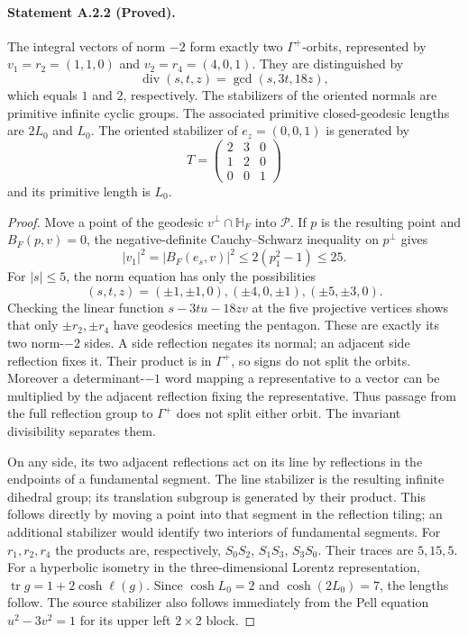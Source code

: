 \paragraph{Statement A.2.2 (Proved).}
The integral vectors of norm $-2$ form exactly two $\Gamma^+$-orbits,
represented by $v_1=r_2=(1,1,0)$ and $v_2=r_4=(4,0,1)$.
They are distinguished by
\[
 \operatorname{div}(s,t,z)=\gcd(s,3t,18z),
\]
which equals $1$ and $2$, respectively. The stabilizers of the oriented
normals are primitive infinite cyclic groups. The associated primitive
closed-geodesic lengths are $2L_0$ and $L_0$. The oriented stabilizer of
$e_z=(0,0,1)$ is generated by
\[
 T=\begin{pmatrix}2&3&0\\1&2&0\\0&0&1\end{pmatrix}
\]
and its primitive length is $L_0$.
\begin{proof}
Move a point of the geodesic $v^\perp\cap\mathbb H_F$ into $\mathcal P$.
If $p$ is the resulting point and $B_F(p,v)=0$, the negative-definite
Cauchy--Schwarz inequality on $p^\perp$ gives
\[
 |v_1|^2=|B_F(e_s,v)|^2\leq2(p_1^2-1)\leq25.
\]
For $|s|\leq5$, the norm equation has only the possibilities
\[(s,t,z)=(\pm1,\pm1,0),(\pm4,0,\pm1),(\pm5,\pm3,0).\]
Checking the linear function $s-3tu-18zv$ at the five projective vertices
shows that only $\pm r_2,\pm r_4$ have geodesics meeting the pentagon.
These are exactly its two norm-$-2$ sides. A side reflection negates its
normal; an adjacent side reflection fixes it. Their product is in
$\Gamma^+$, so signs do not split the orbits. Moreover a determinant-$-1$
word mapping a representative to a vector can be multiplied by the
adjacent reflection fixing the representative. Thus passage from the
full reflection group to $\Gamma^+$ does not split either orbit.
The invariant divisibility separates them.

On any side, its two adjacent reflections act on its line by reflections
in the endpoints of a fundamental segment. The line stabilizer is the
resulting infinite dihedral group; its translation subgroup is generated
by their product. This follows directly by moving a point into that
segment in the reflection tiling; an additional stabilizer would identify
two interiors of fundamental segments. For $r_1,r_2,r_4$ the products are,
respectively, $S_0S_2$, $S_1S_3$, $S_3S_0$. Their traces are $5,15,5$.
For a hyperbolic isometry in the three-dimensional Lorentz representation,
$\operatorname{tr}g=1+2\cosh\ell(g)$. Since
$\cosh L_0=2$ and $\cosh(2L_0)=7$, the lengths follow. The source
stabilizer also follows immediately from the Pell equation
$u^2-3v^2=1$ for its upper left $2\times2$ block.
\end{proof}

